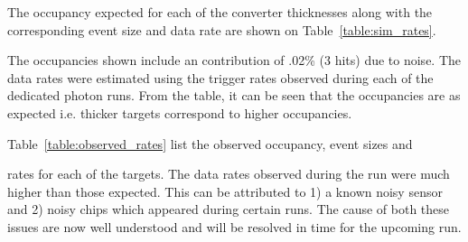 The occupancy expected for each of the converter thicknesses along with the 
corresponding event size and data rate are shown on Table~\ref{table:sim_rates}.
\begin{table}[h]
    \caption{Occupancy, event size and resulting data rate expected for each of the three 
             converter thicknesses used in the test run.}
    \label{table:sim_rates}
\end{table}
The occupancies shown include an contribution of .02\% (3 hits) due to noise.  
The data rates were estimated using the trigger rates observed during each
of the dedicated photon runs. From the table, it can be seen that the 
occupancies are as expected i.e. thicker targets correspond to higher 
occupancies. 

Table~\ref{table:observed_rates} list the observed occupancy, event sizes and 
\begin{table}[h]
    \caption{Occupancy, event size and resulting data rate observed for each of the three 
             converter thicknesses used in the test run.}
    \label{table:observed_rates}
\end{table}    
rates for each of the targets.  The data rates observed during the run were
much higher than those expected.  This can be attributed to 1) a known
noisy sensor and 2) noisy chips which appeared during certain runs.  The cause
of both these issues are now well understood and will be resolved in time 
for the upcoming run.

